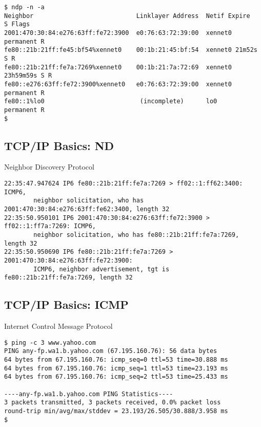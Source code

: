 \documentclass[xga]{xdvislides}
\begin{document}
\begin{verbatim}
$ ndp -n -a
Neighbor                            Linklayer Address  Netif Expire      S Flags
2001:470:30:84:e276:63ff:fe72:3900  e0:76:63:72:39:00  xennet0 permanent R
fe80::21b:21ff:fe45:bf54%xennet0    00:1b:21:45:bf:54  xennet0 21m52s    S R
fe80::21b:21ff:fe7a:7269%xennet0    00:1b:21:7a:72:69  xennet0 23h59m59s S R
fe80::e276:63ff:fe72:3900%xennet0   e0:76:63:72:39:00  xennet0 permanent R
fe80::1%lo0                          (incomplete)      lo0     permanent R
$
\end{verbatim}

\subsection{TCP/IP Basics: ND}
\begin{center}
Neighbor Discovery Protocol
\end{center}
\vspace{.2in}
\begin{verbatim}
22:35:47.947624 IP6 fe80::21b:21ff:fe7a:7269 > ff02::1:ff62:3400: ICMP6,
        neighbor solicitation, who has 2001:470:30:84:e276:63ff:fe62:3400, length 32
22:35:50.950101 IP6 2001:470:30:84:e276:63ff:fe72:3900 > ff02::1:ff7a:7269: ICMP6,
        neighbor solicitation, who has fe80::21b:21ff:fe7a:7269, length 32
22:35:50.950690 IP6 fe80::21b:21ff:fe7a:7269 > 2001:470:30:84:e276:63ff:fe72:3900:
        ICMP6, neighbor advertisement, tgt is fe80::21b:21ff:fe7a:7269, length 32
\end{verbatim}

\subsection{TCP/IP Basics: ICMP}
\begin{center}
Internet Control Message Protocol
\end{center}
\vspace{.2in}

\begin{verbatim}
$ ping -c 3 www.yahoo.com
PING any-fp.wa1.b.yahoo.com (67.195.160.76): 56 data bytes
64 bytes from 67.195.160.76: icmp_seq=0 ttl=53 time=30.888 ms
64 bytes from 67.195.160.76: icmp_seq=1 ttl=53 time=23.193 ms
64 bytes from 67.195.160.76: icmp_seq=2 ttl=53 time=25.433 ms

----any-fp.wa1.b.yahoo.com PING Statistics----
3 packets transmitted, 3 packets received, 0.0% packet loss
round-trip min/avg/max/stddev = 23.193/26.505/30.888/3.958 ms
$
\end{verbatim}
\end{document}
